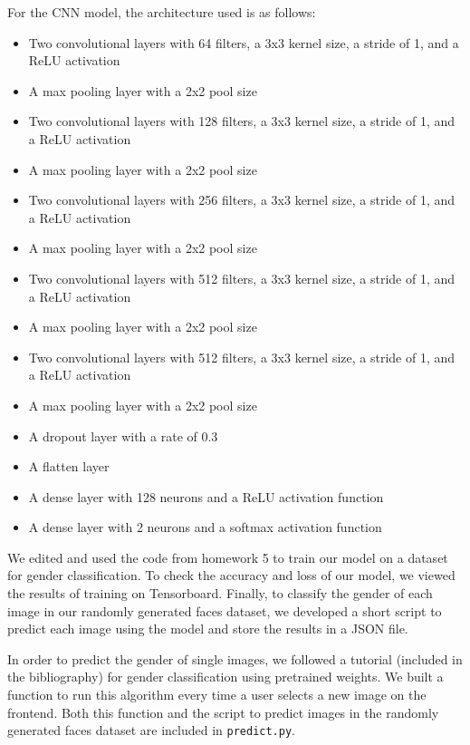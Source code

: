For the CNN model, the architecture used is as follows:
\begin{itemize}
    \item Two convolutional layers with 64 filters, a 3x3 kernel size, a stride of 1, and a ReLU activation
    \item A max pooling layer with a 2x2 pool size
    \item Two convolutional layers with 128 filters, a 3x3 kernel size, a stride of 1, and a ReLU activation
    \item A max pooling layer with a 2x2 pool size
    \item Two convolutional layers with 256 filters, a 3x3 kernel size, a stride of 1, and a ReLU activation
    \item A max pooling layer with a 2x2 pool size
    \item Two convolutional layers with 512 filters, a 3x3 kernel size, a stride of 1, and a ReLU activation
    \item A max pooling layer with a 2x2 pool size
    \item Two convolutional layers with 512 filters, a 3x3 kernel size, a stride of 1, and a ReLU activation
    \item A max pooling layer with a 2x2 pool size
    \item A dropout layer with a rate of 0.3
    \item A flatten layer
    \item A dense layer with 128 neurons and a ReLU activation function
    \item A dense layer with 2 neurons and a softmax activation function
\end{itemize}

We edited and used the code from homework 5 to train our model on a dataset for gender classification. To check
the accuracy and loss of our model, we viewed the results of training on Tensorboard. Finally, to classify the gender of
each image in our randomly generated faces dataset, we developed a short script to predict each image using the model and
store the results in a JSON file.

In order to predict the gender of single images, we followed a tutorial (included in the bibliography) for gender classification using pretrained weights.
We built a function to run this algorithm every time a user selects a new image on the frontend. Both this function and the script to predict images in the randomly generated faces dataset are included in \verb|predict.py|.


